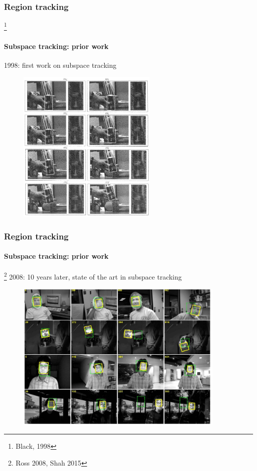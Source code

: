 \begin{frame}
\frametitle{Region tracking}\footnote{Black, 1998}
\framesubtitle{Subspace tracking: prior work}
\mypagenum
\vspace{0.1in}
1998: first work on subspace tracking
	\begin{figure}
		\includegraphics[width=0.6\textwidth]{thesis/TrackingPapers_SubspaceTracking_1998_Black_fig9.png}
	\end{figure}
\end{frame}



\begin{frame}
\frametitle{Region tracking}
\framesubtitle{Subspace tracking: prior work}
\footnote{Ross 2008, Shah 2015}
\mypagenum
\vspace{0.1in}
2008: 10 years later, state of the art in subspace tracking
\begin{figure}
\includegraphics[width=0.9\textwidth]{thesis/TrackingPapers_SubspaceTracking_2008_Ross_fig10.png}
\end{figure}
\end{frame}






